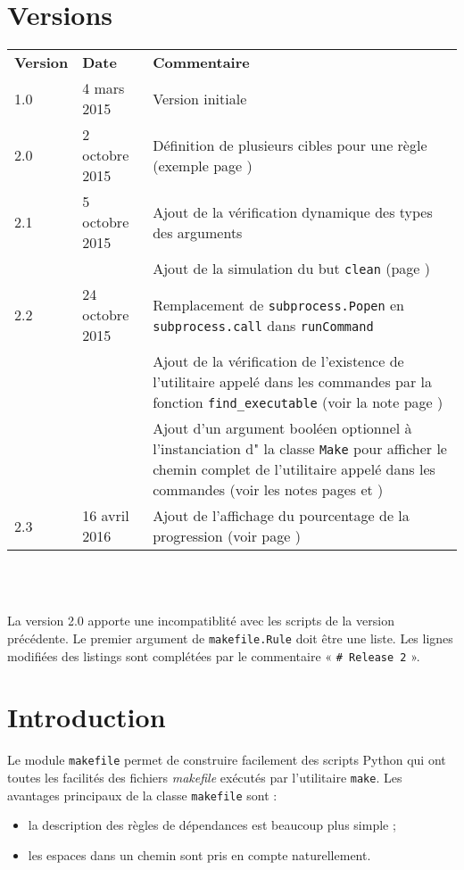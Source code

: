 \documentclass[a4paper,11pt]{extarticle}
\begin{document}
\section{Versions}
  \begin{tabular}{llp{10.5cm}}
    \textbf{Version} & \textbf{Date} & \textbf{Commentaire}\\
    1.0 & 4 mars 2015 & Version initiale \\
    2.0 & 2 octobre 2015 & Définition de plusieurs cibles pour une règle (exemple page \pageref{plusieursCibles})\\
    2.1 & 5 octobre 2015 & Ajout de la vérification dynamique des types des arguments\\
        &                & Ajout de la simulation du but \texttt{clean} (page \pageref{simulationButClean})\\
    2.2 & 24 octobre 2015 & Remplacement de \texttt{subprocess.Popen} en \texttt{subprocess.call} dans \texttt{runCommand}\\
        &                & Ajout de la vérification de l'existence de l'utilitaire appelé dans les commandes par la fonction \texttt{find\_executable} (voir la note page \pageref{verifUtilitaire})\\
        &                & Ajout d'un argument booléen optionnel à l'instanciation d" la classe \texttt{Make} pour afficher le chemin complet de l'utilitaire appelé dans les commandes (voir les notes pages \pageref{logUtilityToolPath} et \pageref{logUtilityToolPath2})\\
    2.3 & 16 avril 2016 & Ajout de l'affichage du pourcentage de la progression (voir page \pageref{affichagePourcentage})\\
  \end{tabular}
\\~


La version 2.0 apporte une incompatiblité avec les scripts de la version précédente. Le premier argument de \texttt{makefile.Rule} doit être une liste. Les lignes modifiées des listings sont complétées par le commentaire « \texttt{\# Release 2} ».


\section{Introduction}

Le module \texttt{makefile} permet de construire facilement des scripts Python qui ont toutes les facilités des fichiers \emph{makefile} exécutés par l'utilitaire \texttt{make}. Les avantages principaux de la classe \texttt{makefile} sont :
\begin{itemize}
  \item la description des règles de dépendances est beaucoup plus simple ;
  \item les espaces dans un chemin sont pris en compte naturellement. 
\end{itemize}
\end{document}
